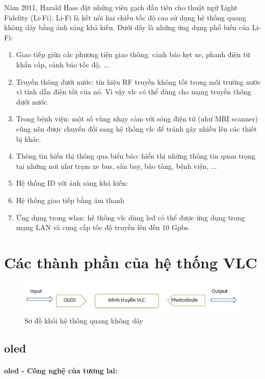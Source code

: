 Năm 2011, Harald Hass đặt những viên gạch đầu tiên cho thuật ngữ Light Fidelity (Li-Fi). Li-Fi là kết nối hai chiều tốc độ cao sử dụng hệ thống quang không dây bằng ánh sáng khả kiến. Dưới dây là những ứng dụng phổ biến của Li-Fi:
\begin{enumerate}
\item Giao tiếp giữa các phương tiện giao thông: cảnh báo kẹt xe, phanh điện tử khẩn cấp, cảnh báo tốc độ, ...
\item Truyền thông dưới nước: tín hiệu RF truyền không tốt trong môi trường nước vì tính dẫn điện tốt của nó. Vì vậy \ac{vlc} có thể dùng cho mạng truyền thông dưới nước.
\item Trong bệnh viện: một số vùng nhạy cảm với sóng điện từ (như MRI scanner) cũng nên được chuyển đổi sang hệ thống \ac{vlc} để tránh gây nhiễu lên các thiết bị khác.
\item Thông tin hiển thị thông qua biển báo: hiển thị những thông tin quan trọng tại những nơi như trạm xe bus, sân bay, bảo tàng, bệnh viện, ...
\item Hệ thống ID với ánh sáng khả kiến: 
\item Hệ thống giao tiếp bằng âm thanh
\item Ứng dụng trong \ac{wlan}: hệ thống \ac{vlc} dùng \ac{led} có thể được ứng dụng trong mạng LAN và cung cấp tốc độ truyền lên đến 10 Gpbs.
\end{enumerate}

\section{Các thành phần của hệ thống VLC}
\begin{figure} [ht]
	\centering
	\captionsetup{justification=centering}
	\includegraphics [scale=0.9] {Image/block_chart}
	\caption{Sơ đồ khối hệ thống quang không dây}
\end{figure}

\subsection{\ac{oled}}
\paragraph{\ac{oled} - Công nghệ của tương lai:}

